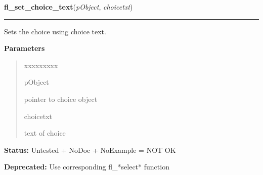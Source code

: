 \hspace{.8\funcindent}\begin{boxedminipage}{\funcwidth}

    \raggedright \textbf{fl\_set\_choice\_text}(\textit{pObject}, \textit{choicetxt})

    \vspace{-1.5ex}

    \rule{\textwidth}{0.5\fboxrule}
\setlength{\parskip}{2ex}
    Sets the choice using choice text.

\setlength{\parskip}{1ex}
      \textbf{Parameters}
      \vspace{-1ex}

      \begin{quote}
        \begin{Ventry}{xxxxxxxxx}

          \item[pObject]

          pointer to choice object

          \item[choicetxt]

          text of choice

        \end{Ventry}

      \end{quote}

\textbf{Status:} Untested + NoDoc + NoExample = NOT OK



\textbf{Deprecated:} Use corresponding fl\_*select* function



    \end{boxedminipage}

    \label{xformslib:library:fl_get_choice}

    \vspace{0.5ex}


